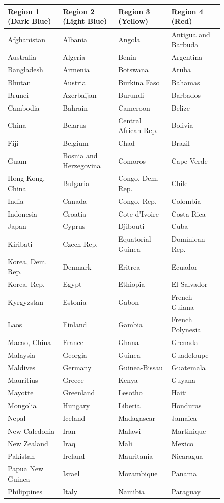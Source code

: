 \documentclass[11pt]{amsart}
\theoremstyle{remark}	  \newtheorem*{remark}{Remark}
\numberwithin{equation}{section}
\begin{document}
\begin{figure}[b]
\centering
\tiny\begin{tabular}{|l|l|l|l|}
\hline
Region 1 (Dark Blue) & Region 2 (Light Blue) &Region 3 (Yellow) &Region 4 (Red)\\
\hline
Afghanistan&Albania&Angola&Antigua and Barbuda \\
Australia&Algeria&Benin&Argentina \\
Bangladesh&Armenia&Botswana&Aruba \\
Bhutan&Austria&Burkina Faso&Bahamas\\
Brunei&Azerbaijan&Burundi&Barbados\\
Cambodia&Bahrain&Cameroon&Belize\\
China&Belarus&Central African Rep.&Bolivia\\
Fiji&Belgium&Chad&Brazil\\
Guam&Bosnia and Herzegovina&Comoros&Cape Verde\\
Hong Kong, China&Bulgaria&Congo, Dem. Rep.&Chile\\
India&Canada&Congo, Rep.&Colombia\\
Indonesia&Croatia&Cote d'Ivoire&Costa Rica\\
Japan&Cyprus&Djibouti&Cuba\\
Kiribati&Czech Rep.&Equatorial Guinea&Dominican Rep.\\
Korea, Dem. Rep.&Denmark&Eritrea&Ecuador\\
Korea, Rep.&Egypt&Ethiopia&El Salvador\\
Kyrgyzstan&Estonia&Gabon&French Guiana\\
Laos&Finland&Gambia&French Polynesia\\
Macao, China&France&Ghana&Grenada\\
Malaysia&Georgia&Guinea&Guadeloupe\\
Maldives&Germany&Guinea-Bissau&Guatemala\\
Mauritius&Greece&Kenya&Guyana\\
Mayotte&Greenland&Lesotho&Haiti\\
Mongolia&Hungary&Liberia&Honduras\\
Nepal&Iceland&Madagascar&Jamaica\\
New Caledonia&Iran&Malawi&Martinique\\
New Zealand&Iraq&Mali&Mexico\\
Pakistan&Ireland&Mauritania&Nicaragua\\
Papua New Guinea&Israel&Mozambique&Panama\\
Philippines&Italy&Namibia&Paraguay\\

\end{tabular}
\end{figure}
\end{document}
